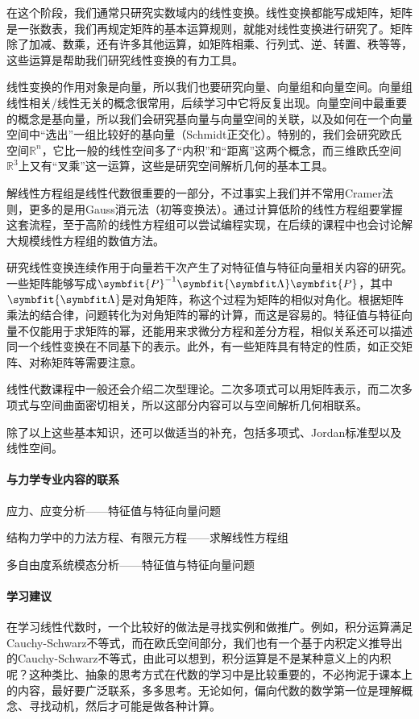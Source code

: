 在这个阶段，我们通常只研究实数域内的线性变换。线性变换都能写成矩阵，矩阵是一张数表，我们再规定矩阵的基本运算规则，就能对线性变换进行研究了。矩阵除了加减、数乘，还有许多其他运算，如矩阵相乘、行列式、逆、转置、秩等等，这些运算是帮助我们研究线性变换的有力工具。

线性变换的作用对象是向量，所以我们也要研究向量、向量组和向量空间。向量组线性相关/线性无关的概念很常用，后续学习中它将反复出现。向量空间中最重要的概念是基向量，所以我们会研究基向量与向量空间的关联，以及如何在一个向量空间中“选出”一组比较好的基向量（Schmidt正交化）。特别的，我们会研究欧氏空间$\mathbb{R}^n$，它比一般的线性空间多了“内积”和“距离”这两个概念，而三维欧氏空间$\mathbb{R}^3$上又有“叉乘”这一运算，这些是研究空间解析几何的基本工具。

解线性方程组是线性代数很重要的一部分，不过事实上我们并不常用Cramer法则，更多的是用Gauss消元法（初等变换法）。通过计算低阶的线性方程组要掌握这套流程，至于高阶的线性方程组可以尝试编程实现，在后续的课程中也会讨论解大规模线性方程组的数值方法。

研究线性变换连续作用于向量若干次产生了对特征值与特征向量相关内容的研究。一些矩阵能够写成$\symbfit{P}^{-1}\symbfit{\symbfit\Lambda} \symbfit{P}$，其中$\symbfit{\symbfit\Lambda}$是对角矩阵，称这个过程为矩阵的相似对角化。根据矩阵乘法的结合律，问题转化为对角矩阵的幂的计算，而这是容易的。特征值与特征向量不仅能用于求矩阵的幂，还能用来求微分方程和差分方程，相似关系还可以描述同一个线性变换在不同基下的表示。此外，有一些矩阵具有特定的性质，如正交矩阵、对称矩阵等需要注意。

线性代数课程中一般还会介绍二次型理论。二次多项式可以用矩阵表示，而二次多项式与空间曲面密切相关，所以这部分内容可以与空间解析几何相联系。

除了以上这些基本知识，还可以做适当的补充，包括多项式、Jordan标准型以及线性空间。

\paragraph{与力学专业内容的联系}

应力、应变分析——特征值与特征向量问题

结构力学中的力法方程、有限元方程——求解线性方程组

多自由度系统模态分析——特征值与特征向量问题

\paragraph{学习建议}

在学习线性代数时，一个比较好的做法是寻找实例和做推广。例如，积分运算满足Cauchy-Schwarz不等式，而在欧氏空间部分，我们也有一个基于内积定义推导出的Cauchy-Schwarz不等式，由此可以想到，积分运算是不是某种意义上的内积呢？这种类比、抽象的思考方式在代数的学习中是比较重要的，不必拘泥于课本上的内容，最好要广泛联系，多多思考。无论如何，偏向代数的数学第一位是理解概念、寻找动机，然后才可能是做各种计算。

